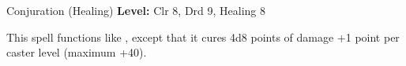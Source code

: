 {Conjuration (Healing)}
{
	\textbf{Level:}
	Clr 8, Drd 9, Healing 8\\
}
{
	This spell functions like , except that it cures 4d8 points of damage +1 point per caster level (maximum +40).

}
